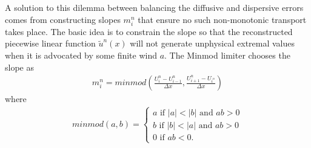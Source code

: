 A solution to this dilemma between balancing the diffusive and dispersive errors comes from constructing slopes $m_i^n$ that ensure no such non-monotonic transport takes place.
The basic idea is to constrain the slope so that the reconstructed piecewise linear function $\tilde{u}^n(x)$ will not generate unphysical extremal values when it is advocated by some finite wind $a$.
The Minmod limiter chooses the slope as 
\begin{gather}
m_i^n = minmod\left(\frac{U_i^n-U_{i-1}^n}{\Delta x},\frac{U_{i+1}^n-U_{i^n}}{\Delta x}\right)
\end{gather}
where
\begin{gather}
minmod(a,b) = \left\{\begin{array}{ccc}a  \mbox{ if } |a| < |b|  \mbox{ and } ab>0\\
b  \mbox{ if } |b|<|a|  \mbox{ and } ab>0\\ 0  \mbox{ if } ab < 0 .\end{array}\right.
\end{gather}


